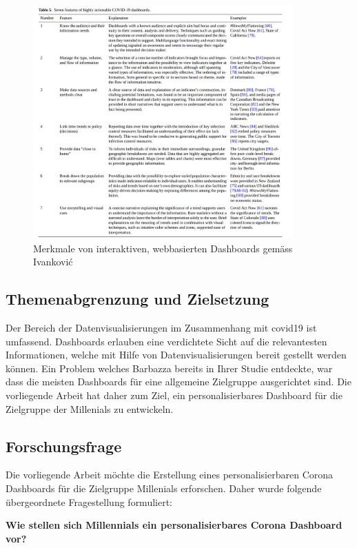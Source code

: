  \begin{figure}[h]
    \includegraphics[width=10cm]{images/ivankovic_dashboard_characteristics.png}
    \centering
    \caption{Merkmale von interaktiven, webbasierten Dashboards gemäss Ivankovi{\'c} ~\citep[S. 12]{ivankovic}}
    \label{fig:ivankovic_characteristics_of_webbased_dashboards}
\end{figure}


\subsection{Themenabgrenzung und Zielsetzung}
Der Bereich der Datenvisualisierungen im Zusammenhang mit \gls{covid19} ist umfassend. Dashboards erlauben eine verdichtete Sicht auf die relevantesten Informationen, welche mit Hilfe von Datenvisualisierungen bereit gestellt werden können. Ein Problem welches Barbazza bereits in Ihrer Studie entdeckte, war dass die meisten Dashboards für eine allgemeine Zielgruppe ausgerichtet sind. Die vorliegende Arbeit hat daher zum Ziel, ein personalisierbares Dashboard für die Zielgruppe der Millenials zu entwickeln.

\subsection{Forschungsfrage}
Die vorliegende Arbeit möchte die Erstellung eines personalisierbaren Corona Dashboards für die Zielgruppe Millenials erforschen. Daher wurde folgende übergeordnete Fragestellung formuliert:

\begin{center}
\textbf{Wie stellen sich Millennials ein personalisierbares Corona Dashboard vor?}
\end{center}

